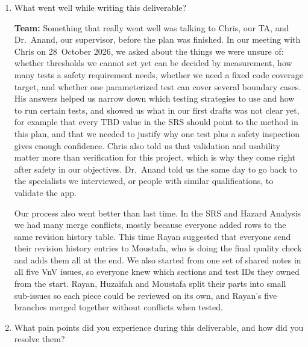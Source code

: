 \documentclass[12pt, titlepage]{article}
\begin{document}
\begin{enumerate}

\item What went well while writing this deliverable?

\textbf{Team:} Something that really went well was talking to Chris, our TA,
and Dr.~Anand, our supervisor, before the plan was finished. In our meeting with
Chris on 28~October 2026, we asked about the things we were unsure of: whether
thresholds we cannot set yet can be decided by measurement, how many tests a
safety requirement needs, whether we need a fixed code coverage target, and
whether one parameterized test can cover several boundary cases. His answers
helped us narrow down which testing strategies to use and how to run certain
tests, and showed us what in our first drafts was not clear yet, for example
that every TBD value in the SRS should point to the method in this plan, and
that we needed to justify why one test plus a safety inspection gives enough
confidence. Chris also told us that validation and usability matter more than
verification for this project, which is why they come right after safety in our
objectives. Dr.~Anand told us the same day to go back to the specialists we
interviewed, or people with similar qualifications, to validate the app.

Our process also went better than last time. In the SRS and Hazard Analysis we
had many merge conflicts, mostly because everyone added rows to the same
revision history table. This time Rayan suggested that everyone send their
revision history entries to Moustafa, who is doing the final quality check and
adds them all at the end. We also started from one set of shared notes in all
five VnV issues, so everyone knew which sections and test IDs they owned from
the start. Rayan, Huzaifah and Moustafa split their parts into small sub-issues
so each piece could be reviewed on its own, and Rayan's five branches merged
together without conflicts when tested.

\item What pain points did you experience during this deliverable, and how did
you resolve them?


\end{enumerate}
\end{document}
